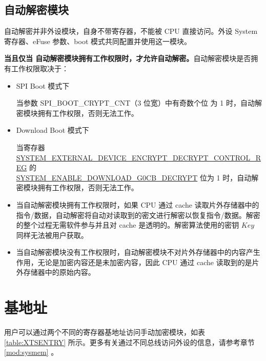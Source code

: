 \documentclass[main\_\_CN.tex]{subfiles}
\begin{document}
\subsection{自动解密模块}

自动解密并非外设模块，自身不带寄存器，不能被 CPU 直接访问。外设 System 寄存器、eFuse 参数、boot 模式共同配置并使用这一模块。

\textbf{当且仅当 自动解密模块拥有工作权限时，才允许自动解密。}自动解密模块是否拥有工作权限取决于：

\begin{itemize}

    \item SPI Boot 模式下

    当参数 SPI\_BOOT\_CRYPT\_CNT（3 位宽）中有奇数个位 为 1 时，自动解密模块拥有工作权限，否则无法工作。

    \item Download Boot 模式下

    当寄存器 \hyperref[regdesc:SYSTEMEXTERNALDEVICEENCRYPTDECRYPTCONTROLREG]{SYSTEM\_EXTERNAL\_DEVICE\_ENCRYPT\_DECRYPT\_CONTROL\_REG} 的 \\ \hyperref[fielddesc:SYSTEMENABLEDOWNLOADG0CBDECRYPT]{SYSTEM\_ENABLE\_DOWNLOAD\_G0CB\_DECRYPT} 位为 1 时，自动解密模块拥有工作权限，否则无法工作。

\end{itemize}


\begin{tiplisting}
\vspace{-2em}
\begin{itemize}

\item 当自动解密模块拥有工作权限时，如果 CPU 通过 cache 读取片外存储器中的指令/数据，自动解密将自动对读取到的密文进行解密以恢复指令/数据。解密的整个过程无需软件参与并且对 cache 是透明的。解密算法使用的密钥 \begin{math}Key\end{math} 同样无法被用户获取。

\item 当自动解密模块没有工作权限时，自动解密模块不对片外存储器中的内容产生作用，无论是加密内容还是未加密内容，因此 CPU 通过 cache 读取到的是片外存储器中的原始内容。

\end{itemize}
\end{tiplisting}


\section{基地址}\label{manualencryptionbaseaddress}
用户可以通过两个不同的寄存器基地址访问手动加密模块，如表 \ref{table:XTSENTRY} 所示。更多有关通过不同总线访问外设的信息，请参考章节 \ref{mod:sysmem} \textit{}。
\end{document}
